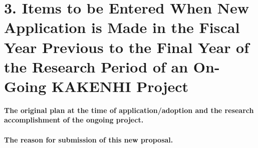 
\section{3. Items to be Entered When New Application is Made in the Fiscal Year Previous to the Final Year of the Research Period of an On-Going KAKENHI Project}

\newcommand{\最終年度研究種目名}{基盤研究（Z）}
\newcommand{\最終年度研究課題番号}{99999}
\newcommand{\最終年度研究課題名}{シロナガスクジラの卵はなぜ見つけられないのか}
\newcommand{\最終年度研究期間}{平成25年度〜令和\一年目 年度}


\noindent
\textbf{The original plan at the time of application/adoption and the research accomplishment of the ongoing project.}\\
\vspace*{10zw} %
\\

\noindent
\textbf{The reason for submission of this new proposal.}\\

